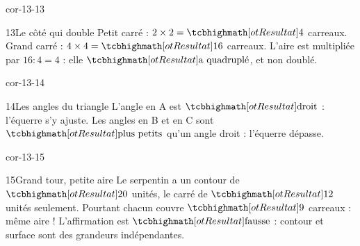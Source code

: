 \begin{blocLivre}{cor-13-13}\begin{corrige}{13}{Le côté qui double}
Petit carré : $2\times2=\res4$ carreaux. Grand carré : $4\times4=\res{16}$ carreaux. L’aire est multipliée par $16:4=4$ : elle $\res{\text{a quadruplé}}$, et non doublé.
\label{fig-cor-13-13}
\end{corrige}\end{blocLivre}
\begin{blocLivre}{cor-13-14}\begin{corrige}{14}{Les angles du triangle}
L’angle en A est $\res{\text{droit}}$ : l’équerre s’y ajuste. Les angles en B et en C sont $\res{\text{plus petits}}$ qu’un angle droit : l’équerre dépasse.
\label{fig-cor-13-14}
\end{corrige}\end{blocLivre}
\begin{blocLivre}{cor-13-15}\begin{corrige}{15}{Grand tour, petite aire}
Le serpentin a un contour de $\res{20}$ unités, le carré de $\res{12}$ unités seulement. Pourtant chacun couvre $\res9$ carreaux : même aire ! L’affirmation est $\res{\text{fausse}}$ : contour et surface sont des grandeurs indépendantes.
\label{fig-cor-13-15}
\end{corrige}\end{blocLivre}
